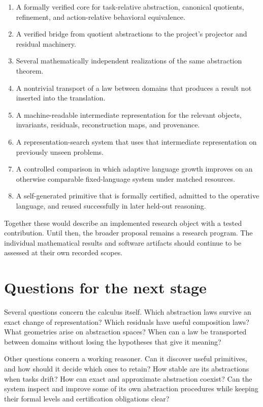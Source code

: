 \documentclass[11pt,oneside,openany]{book}
\begin{document}
\begin{enumerate}
\item A formally verified core for task-relative abstraction, canonical quotients, refinement, and action-relative behavioral equivalence.
\item A verified bridge from quotient abstractions to the project's projector and residual machinery.
\item Several mathematically independent realizations of the same abstraction theorem.
\item A nontrivial transport of a law between domains that produces a result not inserted into the translation.
\item A machine-readable intermediate representation for the relevant objects, invariants, residuals, reconstruction maps, and provenance.
\item A representation-search system that uses that intermediate representation on previously unseen problems.
\item A controlled comparison in which adaptive language growth improves on an otherwise comparable fixed-language system under matched resources.
\item A self-generated primitive that is formally certified, admitted to the operative language, and reused successfully in later held-out reasoning.
\end{enumerate}

Together these would describe an implemented research object with a tested contribution. Until then, the broader proposal remains a research program. The individual mathematical results and software artifacts should continue to be assessed at their own recorded scopes.

\section{Questions for the next stage}
Several questions concern the calculus itself. Which abstraction laws survive an exact change of representation? Which residuals have useful composition laws? What geometries arise on abstraction spaces? When can a law be transported between domains without losing the hypotheses that give it meaning?

Other questions concern a working reasoner. Can it discover useful primitives, and how should it decide which ones to retain? How stable are its abstractions when tasks drift? How can exact and approximate abstraction coexist? Can the system inspect and improve some of its own abstraction procedures while keeping their formal levels and certification obligations clear?
\end{document}
